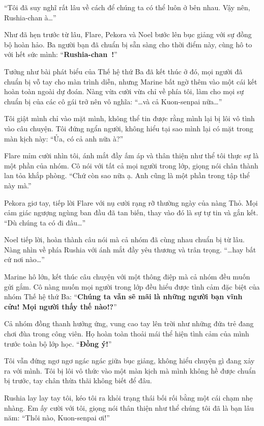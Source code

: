 \documentclass[../main.tex]{subfiles}
\begin{document}
``Tôi đã suy nghĩ rất lâu về cách để chúng ta có thể luôn ở bên nhau. Vậy nên, Rushia-chan à\dots''

Như đã hẹn trước từ lâu, Flare, Pekora và Noel bước lên bục giảng với sự đồng bộ hoàn hảo. Ba người bạn đã chuẩn bị sẵn sàng cho thời điểm này, cùng hô to với hết sức mình: ``\textbf{Rushia-chan~!}''

Tưởng như bài phát biểu của Thế hệ thứ Ba đã kết thúc ở đó, mọi người đã chuẩn bị vỗ tay cho màn trình diễn, nhưng Marine bất ngờ thêm vào một cái kết hoàn toàn ngoài dự đoán. Nàng vừa cười vừa chỉ về phía tôi, làm cho mọi sự chuẩn bị của các cô gái trở nên vô nghĩa: ``\dots và cả Kuon-senpai nữa\dots''

Tôi giật mình chỉ vào mặt mình, không thể tin được rằng mình lại bị lôi vô tình vào câu chuyện. Tôi đứng ngẩn người, không hiểu tại sao mình lại có mặt trong màn kịch này: ``Ủa, có cả anh nữa à?''

Flare mỉm cười nhìn tôi, ánh mắt đầy ấm áp và thân thiện như thể tôi thực sự là một phần của nhóm. Cô nói với tất cả mọi người trong lớp, giọng nói chân thành lan tỏa khắp phòng. ``Chứ còn sao nữa ạ. Anh cũng là một phần trong tập thể này mà.''

Pekora giơ tay, tiếp lời Flare với nụ cười rạng rỡ thường ngày của nàng Thỏ. Mọi cảm giác ngượng ngùng ban đầu đã tan biến, thay vào đó là sự tự tin và gắn kết. ``Dù chúng ta có đi đâu\dots''

Noel tiếp lời, hoàn thành câu nói mà cả nhóm đã cùng nhau chuẩn bị từ lâu. Nàng nhìn về phía Rushia với ánh mắt đầy yêu thương và trân trọng. ``\dots hay bất cứ nơi nào\dots''

Marine hô lớn, kết thúc câu chuyện với một thông điệp mà cả nhóm đều muốn gửi gắm. Cô nàng muốn mọi người trong lớp đều hiểu được tình cảm đặc biệt của nhóm Thế hệ thứ Ba: ``\textbf{Chúng ta vẫn sẽ mãi là những người bạn vĩnh cửu! Mọi người thấy thế nào!?}''

Cả nhóm đồng thanh hưởng ứng, vung cao tay lên trời như những đứa trẻ đang chơi đùa trong công viên. Họ hoàn toàn thoải mái thể hiện tình cảm của mình trước toàn bộ lớp học. ``\textbf{Đồng ý!}''

Tôi vẫn đứng ngơ ngơ ngác ngác giữa bục giảng, không hiểu chuyện gì đang xảy ra với mình. Tôi bị lôi vô thức vào một màn kịch mà mình không hề được chuẩn bị trước, tay chân thừa thãi không biết để đâu.

Rushia lay lay tay tôi, kéo tôi ra khỏi trạng thái bối rối bằng một cái chạm nhẹ nhàng. Em ấy cười với tôi, giọng nói thân thiện như thể chúng tôi đã là bạn lâu năm: ``Thôi nào, Kuon-senpai ơi!''
\end{document}
